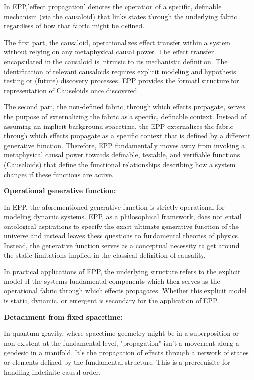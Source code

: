 \documentclass{article}
\begin{document}
In EPP,'effect propagation' denotes the operation of a specific, definable mechanism (via the causaloid) that links states through the underlying fabric regardless of how that fabric might be defined.

The first part, the causaloid, operationalizes effect transfer within a system without relying on any metaphysical causal power. The effect transfer encapsulated in the causaloid is  intrinsic to its mechanistic definition. The identification of relevant causaloids requires explicit modeling and hypothesis testing or (future) discovery processes. EPP provides the formatl structure for representation of Causeloids once discovered.

The second part, the non-defined fabric, through which effects propagate, serves the purpose of externalizing the fabric as a specific, definable context. Instead of assuming an implicit background spacetime, the EPP externalizes the fabric through which effects propagate as a specific context that is defined by a different generative function.
Therefore, EPP fundamentally moves away from invoking a metaphysical causal power towards definable, testable, and verifiable functions (Causaloids) that define the functional relationships describing how a system changes if these functions   are active.


\textbf{Operational generative function:}

In EPP, the aforementioned generative function is strictly operational for modeling dynamic systems. EPP, as a philosophical framework, does not entail ontological aspirations to specify the exact ultimate generative function of the universe and instead leaves these questions to fundamental theories of physics. Instead, the generative function serves as a conceptual necessity to get around the static limitations implied in the classical definition of causality.

In practical applications of EPP, the underlying structure refers to the explicit model of the systems fundamental components which then serves as the operational fabric through which effects propagates. Whether this explicit model is static, dynamic, or emergent is secondary for the application of EPP.

\textbf{Detachment from fixed spacetime:}

In quantum gravity, where spacetime geometry might be in a superposition or non-existent at the fundamental level, "propagation" isn't a movement along a geodesic in a manifold. It's the propagation of effects through a network of states or elements defined by the fundamental structure. This is a prerequisite for handling indefinite causal order.
\end{document}
